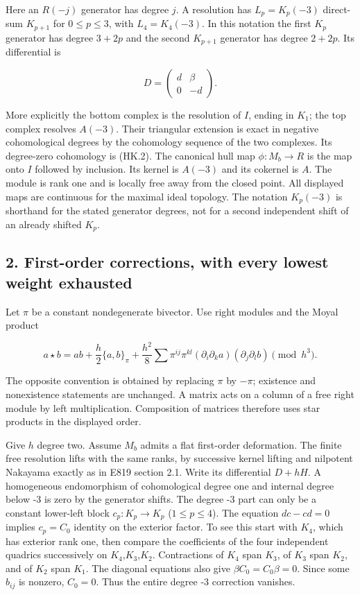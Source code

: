 Here an \(R(-j)\) generator has degree \(j\). A resolution has
\(L_p=K_p(-3)\) direct-sum \(K_{p+1}\) for \(0\le p\le3\), with \(L_4=K_4(-3)\).
In this notation the first \(K_p\) generator has degree \(3+2p\) and the second
\(K_{p+1}\) generator has degree \(2+2p\). Its differential is

\[
 D=\begin{pmatrix}d&\beta\\0&-d\end{pmatrix}.
 \tag{HK.3}
\]

More explicitly the bottom complex is the resolution of \(I\), ending in \(K_1\);
the top complex resolves \(A(-3)\). Their triangular extension is exact in
negative cohomological degrees by the cohomology sequence of the two
complexes. Its degree-zero cohomology is (HK.2). The canonical hull map
\(\phi:M_b\to R\) is the map onto \(I\) followed by inclusion. Its kernel is \(A(-3)\)
and its cokernel is \(A\). The module is rank one and is locally free away
from the closed point. All displayed maps are continuous for the maximal
ideal topology. The notation \(K_p(-3)\) is shorthand for the stated generator
degrees, not for a second independent shift of an already shifted \(K_p\).

\subsection{2. First-order corrections, with every lowest weight exhausted}\label{SF-E846:s2}

Let \(\pi\) be a constant nondegenerate bivector. Use right modules and the
Moyal product

\[
 a\star b=ab+\frac h2\{a,b\}_\pi+
 \frac{h^2}{8}\sum\pi^{ij}\pi^{kl}
       (\partial_i\partial_k a)(\partial_j\partial_l b)
        \pmod {h^3}.
 \tag{HK.4}
\]

The opposite convention is obtained by replacing \(\pi\) by \(-\pi\); existence
and nonexistence statements are unchanged. A matrix acts on a column
of a free right module by left multiplication. Composition of matrices
therefore uses star products in the displayed order.

Give \(h\) degree two. Assume \(M_b\) admits a flat first-order deformation.
The finite free resolution lifts with the same ranks, by successive
kernel lifting and nilpotent Nakayama exactly as in E819 section 2.1.
Write its differential \(D+hH\). A homogeneous endomorphism of cohomological
degree one and internal degree below -3 is zero by the generator shifts.
The degree -3 part can only be a constant lower-left block \(c_p:K_p\to K_p\)
(\(1\le p\le4\)). The equation \(dc-cd=0\) implies \(c_p=C_0\) identity on the exterior
factor. To see this start with \(K_4\), which has exterior rank one, then
compare the coefficients of the four independent quadrics successively
on \(K_4\),\(K_3\),\(K_2\). Contractions of \(K_4\) span \(K_3\), of \(K_3\) span \(K_2\), and of \(K_2\) span \(K_1\).
The diagonal equations also give \(\beta C_0=C_0\beta=0\). Since some \(b_{ij}\) is
nonzero, \(C_0=0\). Thus the entire degree -3 correction vanishes.

